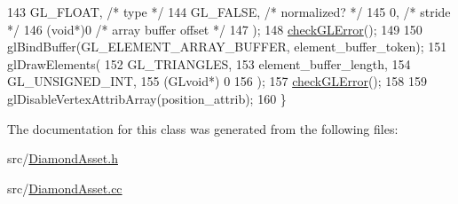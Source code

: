 \begin{DoxyCode}
143     GL\_FLOAT,   \textcolor{comment}{/* type */}
144     GL\_FALSE,   \textcolor{comment}{/* normalized? */}
145     0,        \textcolor{comment}{/* stride */}
146     (\textcolor{keywordtype}{void}*)0    \textcolor{comment}{/* array buffer offset */}
147   );
148   \hyperlink{DiamondAsset_8cc_a75f201b0e53e68726854997957322b8d}{checkGLError}();
149 
150   glBindBuffer(GL\_ELEMENT\_ARRAY\_BUFFER, element\_buffer\_token);
151   glDrawElements(
152     GL\_TRIANGLES,
153     element\_buffer\_length,
154     GL\_UNSIGNED\_INT,
155     (GLvoid*) 0
156   );
157   \hyperlink{DiamondAsset_8cc_a75f201b0e53e68726854997957322b8d}{checkGLError}();
158 
159   glDisableVertexAttribArray(position\_attrib);
160 \}
\end{DoxyCode}


The documentation for this class was generated from the following files\+:\begin{DoxyCompactItemize}
\item 
src/\hyperlink{DiamondAsset_8h}{Diamond\+Asset.\+h}\item 
src/\hyperlink{DiamondAsset_8cc}{Diamond\+Asset.\+cc}\end{DoxyCompactItemize}
